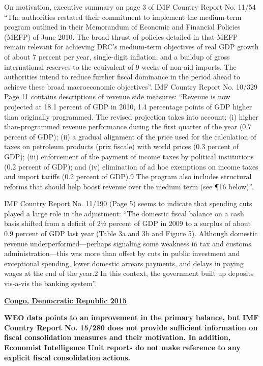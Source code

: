 On motivation, executive summary on page 3 of IMF Country Report No. 11/54 “The authorities restated their commitment to implement the medium-term program outlined in their Memorandum of Economic and Financial Policies (MEFP) of June 2010. The broad thrust of policies detailed in that MEFP remain relevant for achieving DRC’s medium-term objectives of real GDP growth of about 7 percent per year, single-digit inflation, and a buildup of gross international reserves to the equivalent of 9 weeks of non-aid imports. The authorities intend to reduce further fiscal dominance in the period ahead to achieve these broad macroeconomic objectives”.
IMF Country Report No. 10/329 Page 11 contains descriptions of revenue side measures: “Revenue is now projected at 18.1 percent of GDP in 2010, 1.4 percentage points of GDP higher than originally programmed. The revised projection takes into account: (i) higher than-programmed revenue performance during the first quarter of the year (0.7 percent of GDP); (ii) a gradual alignment of the price used for the calculation of taxes on petroleum products (prix fiscale) with world prices (0.3 percent of GDP); (iii) enforcement of the payment of income taxes by political institutions (0.2 percent of GDP); and (iv) elimination of ad hoc exemptions on income taxes and import tariffs (0.2 percent of GDP).9 The program also includes structural reforms that should help boost revenue over the medium term (see ¶16 below)”.

IMF Country Report No. 11/190 (Page 5) seems to indicate that spending cuts played a large role in the adjustment: “The domestic fiscal balance on a cash basis shifted from a deficit of 2½ percent of GDP in 2009 to a surplus of about 0.9 percent of GDP last year (Table 3a and 3b and Figure 5). Although domestic revenue underperformed—perhaps signaling some weakness in tax and customs administration—this was more than offset by cuts in public investment and exceptional spending, lower domestic arrears payments, and delays in paying wages at the end of the year.2 In this context, the government built up deposits vis-a-vis the banking system”.

\textbf{\underline{Congo, Democratic Republic 2015}}

\textbf{WEO data points to an improvement in the primary balance, but IMF Country Report No. 15/280 does not provide sufficient information on fiscal consolidation measures and their motivation. In addition, Economist Intelligence Unit reports do not make reference to any explicit fiscal consolidation actions.} 

